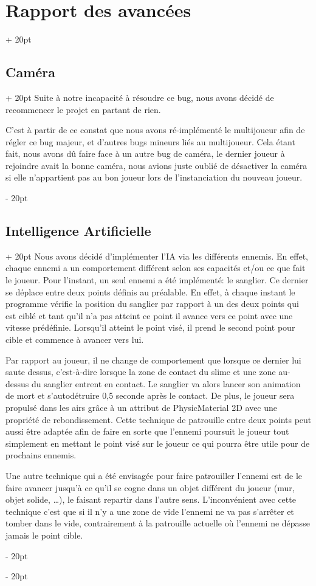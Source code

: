 \documentclass[a4paper, 12pt, twoside]{article}
\newcommand{\ind}[1][20pt]{\advance\leftskip + #1}
\newcommand{\deind}[1][20pt]{\advance\leftskip - #1}
\newenvironment{indt}[2][20pt]{#2 \par \ind[#1]}{\par \deind} %
\begin{document}
\begin{indt}{\section{Rapport des avancées}}
\begin{indt}{\subsection{Caméra}}
            Suite à notre incapacité à résoudre ce bug, nous avons décidé de recommencer le projet en partant de rien.

            C'est à partir de ce constat que nous avons ré-implémenté le multijoueur afin de régler ce bug majeur, et d'autres bugs mineurs liés au multijoueur. Cela étant fait, nous avons dû faire face à un autre bug de caméra, le dernier joueur à rejoindre avait la bonne caméra, nous avions juste oublié de désactiver la caméra si elle n'appartient pas au bon joueur lors de l'instanciation du nouveau joueur.

        \end{indt}

        \begin{indt}{\subsection{Intelligence Artificielle}}
            Nous avons décidé d'implémenter l'IA via les différents ennemis. En effet, chaque ennemi a un comportement différent selon ses capacités et/ou ce que fait le joueur. Pour l'instant, un seul ennemi a été implémenté: le sanglier. Ce dernier se déplace entre deux points définis au préalable. En effet, à chaque instant le programme vérifie la position du sanglier par rapport à un des deux points qui est ciblé et tant qu'il n'a pas atteint ce point  il avance vers ce point avec une vitesse prédéfinie. Lorsqu'il atteint le point visé, il prend le second point pour cible et commence à avancer vers lui. 

            Par rapport au joueur, il ne change de comportement que lorsque ce dernier lui saute dessus, c'est-à-dire lorsque la zone de contact du slime et une zone au-dessus du sanglier entrent en contact. Le sanglier va alors lancer son animation de mort et s'autodétruire 0,5 seconde après le contact. De plus, le joueur sera propulsé dans les airs grâce à un attribut de PhysicMaterial 2D avec une propriété de rebondissement. Cette technique de patrouille entre deux points  peut aussi être adaptée afin de faire en sorte que l'ennemi poursuit le joueur tout simplement en mettant le point visé sur le joueur ce qui pourra être utile pour de prochains ennemis. 

            Une autre technique qui a été envisagée pour faire patrouiller l'ennemi est de le faire avancer jusqu'à ce qu'il se cogne dans un objet différent du joueur (mur, objet solide, …), le faisant repartir dans l'autre sens. L'inconvénient avec cette technique c'est que si il n'y a une zone de vide l'ennemi ne va pas s'arrêter et tomber dans le vide, contrairement à la patrouille actuelle où l'ennemi ne dépasse jamais le point cible.


\end{indt}
\end{indt}
\end{document}
